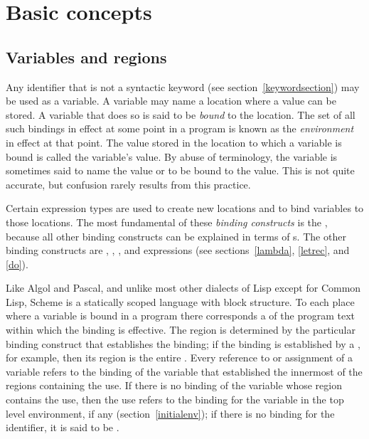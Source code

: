 \chapter{Basic concepts}
\label{basicchapter}

\section{Variables and regions}
\label{specialformsection}
\label{variablesection}

Any identifier that is not a syntactic keyword (see
section~\ref{keywordsection}) may be used as a variable.  A variable may name a
location where a value can be stored.  A variable that does so is said
to be {\em bound} to the location.  The set of all such
bindings in effect at some point in a program is
known as the {\em environment} in effect at that point.  The value
stored in the location to which a variable is bound is called the
variable's value.  By abuse of terminology, the variable is sometimes
said to name the value or to be bound to the value.  This is not quite
accurate, but confusion rarely results from this practice.



\vest Certain expression types are used to create new locations and to
bind variables to those locations.  The most fundamental of these {\em
binding constructs} is the
\lambdaexp{}\index{\lambdaexp{}}, because all other binding constructs
can be explained in terms of \lambdaexp{}s.  The other binding
constructs are , , , and 
expressions (see sections~\ref{lambda}, \ref{letrec}, and \ref{do}).


\vest Like Algol and Pascal, and unlike most other dialects of Lisp
except for Common Lisp, Scheme is a statically scoped language with
block structure.  To each place where a variable is bound in a program
there corresponds a  of the program text within which
the binding is effective.  The region is determined by the particular
binding construct that establishes the binding; if the binding is
established by a \lambdaexp{}, for example, then its region
is the entire \lambdaexp{}.  Every reference to or assignment of a
variable refers to the binding of the variable that established the
innermost of the regions containing the use.  If there is no binding of
the variable whose region contains the use, then the use refers to the
binding for the variable in the top level environment, if any
(section~\ref{initialenv}); if there is no binding for the identifier,
it is said to be .

